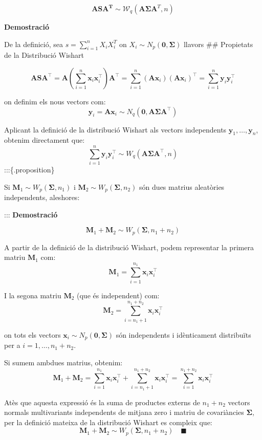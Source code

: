\documentclass[
  catalan,
]{article}
\theoremstyle{definition}
\theoremstyle{definition}
\theoremstyle{definition}
\theoremstyle{definition}
\theoremstyle{remark}
\begin{document}
\[
 \mathbf{ASA^T} \sim  \mathcal{W}_q(\mathbf{A} \boldsymbol{\Sigma} \mathbf{A}^T, n)
 \]

\textbf{Demostració}

De la definició, sea \(s=\sum_{i=1}^n X_i X_i^T\) on \(X_i \sim N_p(\mathbf{0},\boldsymbol{\Sigma})\) llavors
\#\# Propietats de la Distribució Wishart

\[\mathbf{A} \mathbf{S} \mathbf{A}^\top = \mathbf{A} \left( \sum_{i=1}^n \mathbf{x}_i \mathbf{x}_i^\top \right) \mathbf{A}^\top = \sum_{i=1}^n (\mathbf{A} \mathbf{x}_i) (\mathbf{A} \mathbf{x}_i)^\top = \sum_{i=1}^n \mathbf{y}_i \mathbf{y}_i^\top\]

on definim els nous vectors com:
\[\mathbf{y}_i = \mathbf{A} \mathbf{x}_i \sim N_q(\mathbf{0}, \mathbf{A} \mathbf{\Sigma} \mathbf{A}^\top)\]

Aplicant la definició de la distribució Wishart als vectors independents \(\mathbf{y}_1, \dots, \mathbf{y}_n\), obtenim directament que:
\[\sum_{i=1}^n \mathbf{y}_i \mathbf{y}_i^\top \sim W_q(\mathbf{A} \mathbf{\Sigma} \mathbf{A}^\top, n)\]
:::\{.proposition\}

Si \(\mathbf{M}_1 \sim W_p(\mathbf{\Sigma}, n_1)\) i \(\mathbf{M}_2 \sim W_p(\mathbf{\Sigma}, n_2)\) són dues matrius aleatòries independents, aleshores:

:::
\textbf{Demostració}

\[\mathbf{M}_1 + \mathbf{M}_2 \sim W_p(\mathbf{\Sigma}, n_1 + n_2)\]

A partir de la definició de la distribució Wishart, podem representar la primera matriu \(\mathbf{M}_1\) com:
\[\mathbf{M}_1 = \sum_{i=1}^{n_1} \mathbf{x}_i \mathbf{x}_i^\top\]

I la segona matriu \(\mathbf{M}_2\) (que és independent) com:
\[\mathbf{M}_2 = \sum_{i=n_1+1}^{n_1+n_2} \mathbf{x}_i \mathbf{x}_i^\top\]

on tots els vectors \(\mathbf{x}_i \sim N_p(\mathbf{0}, \mathbf{\Sigma})\) són independents i idènticament distribuïts per a \(i = 1, \dots, n_1 + n_2\).

Si sumem ambdues matrius, obtenim:
\[\mathbf{M}_1 + \mathbf{M}_2 = \sum_{i=1}^{n_1} \mathbf{x}_i \mathbf{x}_i^\top + \sum_{i=n_1+1}^{n_1+n_2} \mathbf{x}_i \mathbf{x}_i^\top = \sum_{i=1}^{n_1+n_2} \mathbf{x}_i \mathbf{x}_i^\top\]

Atès que aquesta expressió és la suma de productes externs de \(n_1 + n_2\) vectors normals multivariants independents de mitjana zero i matriu de covariàncies \(\mathbf{\Sigma}\), per la definició mateixa de la distribució Wishart es compleix que:
\[\mathbf{M}_1 + \mathbf{M}_2 \sim W_p(\mathbf{\Sigma}, n_1 + n_2) \quad \blacksquare\]
\end{document}
